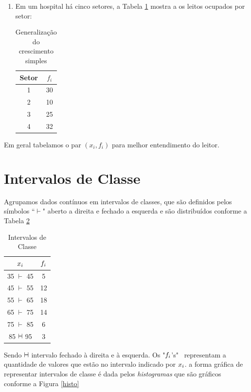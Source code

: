 \noindent \exemplo
\begin{enumerate}
    \item[(i)] Em um hospital há cinco setores, a Tabela \ref{exemplo1} mostra a os leitos ocupados por setor:
\begin{table}[H]
    \caption{Generalização do crescimento simples}
    \label{exemplo1}
    \centering
    \begin{tabular}{cc}
    \hline
    Setor & $f_i$ \\
    \hline
    1 & 30 \\
    2 & 10 \\
    3 & 25 \\
    4 & 32 \\
    \hline
    \end{tabular}
\end{table}
\end{enumerate}
\inic Em geral tabelamos o par $(x_i, f_i)$ para melhor entendimento do leitor.
\section{Intervalos de Classe}
Agrupamos dados contínuos em intervalos de classes, que são definidos pelos símbolos ``$\vdash$" aberto a direita e fechado a esquerda e são distribuídos conforme a Tabela \ref{classes} 
	\begin{table}[H]
        \centering
        \caption{Intervalos de Classe}
        \label{classes}
		    \begin{tabular}{cc}
		    \hline
		    $\mathnormal{x_i}$ & $\mathnormal{f_i}$\\
		    \hline
		    35 $\vdash$ 45 & 5\\
		    45 $\vdash$ 55 & 12\\
		    55 $\vdash$ 65 & 18\\
	    	65 $\vdash$ 75 & 14\\
	    	75 $\vdash$ 85 & 6\\
	    	85 $\vdash \hspace{-0.2 cm }\dashv$ 95 & 3\\
		    \hline
		\end{tabular}
	\end{table}
	
Sendo $\vdash \hspace{-0.2 cm }\dashv$ intervalo fechado à direita e à esquerda. Os "$\mathnormal{f_i}$'s" \, representam a quantidade de valores que estão no intervalo indicado por $\mathnormal{x_i}$. a forma gráfica de representar intervalos de classe é dada pelos \textit{histogramas} que são gráficos conforme a Figura \ref{histo}
    
